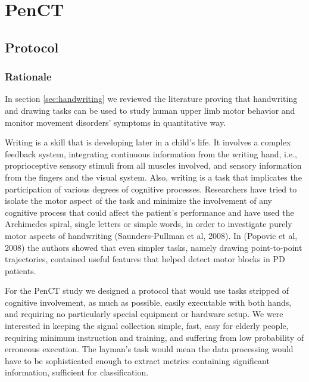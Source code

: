 \section{PenCT}
\label{sec:PenCT}

\subsection{Protocol}
\label{subsec:PenCTProtocol}

\subsubsection{Rationale}
\label{subsubsec:PenCTRationale}
In section \ref{sec:handwriting} we reviewed the literature proving that handwriting and drawing tasks can be used to study human upper limb motor behavior and monitor movement disorders' symptoms in quantitative way. 

Writing is a skill that is developing later in a child's life. It involves a complex feedback system, integrating continuous information from the writing hand, i.e., proprioceptive sensory stimuli from all muscles involved, and sensory information from the fingers and the visual system. Also, writing is a task that implicates the participation of various degrees of cognitive processes. Researchers have tried to isolate the motor aspect of the task and minimize the involvement of any cognitive process that could affect the patient's performance and have used the Archimedes spiral, single letters or simple words, in order to investigate purely motor aspects of handwriting (Saunders-Pullman et al, 2008). In (Popovic et al, 2008) the authors showed that even simpler tasks, namely drawing point-to-point trajectories, contained useful features that helped detect motor blocks in \gls{PD} patients.

For the \gls{PenCT} study we designed a protocol that would use tasks stripped of cognitive involvement, as much as possible, easily executable with both hands, and requiring no particularly special equipment or hardware setup. We were interested in keeping the signal collection simple, fast, easy for elderly people, requiring minimum instruction and training, and suffering from low probability of erroneous execution. The layman's task would mean the data processing would have to be sophisticated enough to extract metrics containing significant information, sufficient for classification. 

